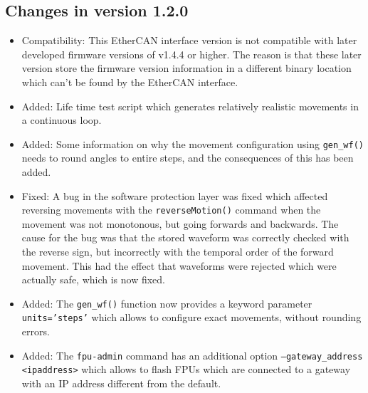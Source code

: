 \documentclass[11pt,a4paper]{scrartcl}
\begin{document}
\subsection*{Changes in version 1.2.0}
\begin{itemize}
\item Compatibility: This EtherCAN interface version is not compatible with later
  developed firmware versions of v1.4.4 or higher. The reason is that
  these later version store the firmware version information in a
  different binary location which can't be found by the EtherCAN interface.
  
\item Added: Life time test script which generates relatively
  realistic movements in a continuous loop.
  
\item Added: Some information on why the movement configuration using
  \texttt{gen\_wf()} needs to round angles to entire steps, and the
  consequences of this has been added.

\item Fixed: A bug in the software protection layer was fixed which
  affected reversing movements with the \texttt{reverseMotion()}
  command when the movement was not monotonous, but going forwards and
  backwards. The cause for the bug was that the stored waveform was
  correctly checked with the reverse sign, but incorrectly with the
  temporal order of the forward movement. This had the effect that
  waveforms were rejected which were actually safe, which is now
  fixed.
    
\item Added: The \texttt{gen\_wf()} function now provides a keyword
  parameter \texttt{units='steps'} which allows to configure exact
  movements, without rounding errors.

\item Added: The \texttt{fpu-admin} command has an additional option
  \texttt{--gateway\_address <ipaddress>} which allows to flash
  FPUs which are connected to a gateway with an IP address different
  from the default.
  

\end{itemize}
\end{document}
